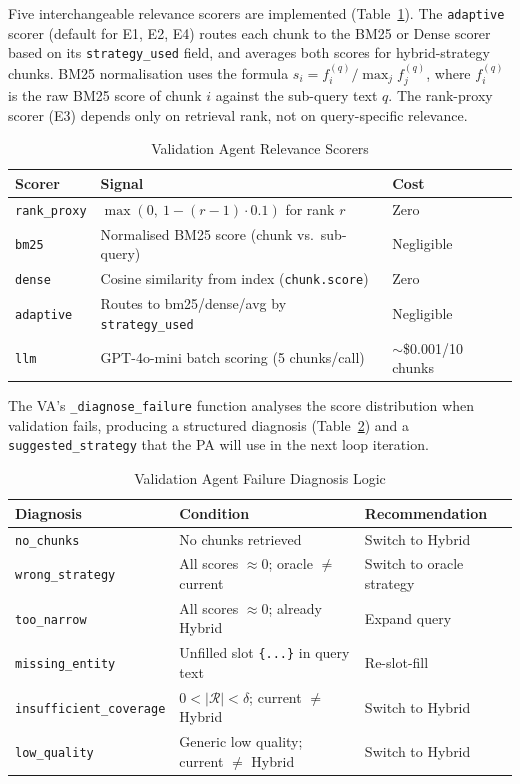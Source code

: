 \documentclass[11pt, a4paper]{article}
\begin{document}
Five interchangeable relevance scorers are implemented (Table~\ref{tab:scorers}). The \texttt{adaptive} scorer (default for E1, E2, E4) routes each chunk to the BM25 or Dense scorer based on its \texttt{strategy\_used} field, and averages both scores for hybrid-strategy chunks. BM25 normalisation uses the formula $s_i = f_i^{(q)} / \max_j f_j^{(q)}$, where $f_i^{(q)}$ is the raw BM25 score of chunk $i$ against the sub-query text $q$. The rank-proxy scorer (E3) depends only on retrieval rank, not on query-specific relevance.

\begin{table}[htbp]
\centering
\caption{Validation Agent Relevance Scorers}
\label{tab:scorers}
\begin{tabular}{lll}
\toprule
\textbf{Scorer} & \textbf{Signal} & \textbf{Cost} \\
\midrule
\texttt{rank\_proxy}  & $\max(0,\ 1 - (r{-}1) \cdot 0.1)$ for rank $r$ & Zero \\
\texttt{bm25}         & Normalised BM25 score (chunk vs.\ sub-query) & Negligible \\
\texttt{dense}        & Cosine similarity from index (\texttt{chunk.score}) & Zero \\
\texttt{adaptive}     & Routes to bm25/dense/avg by \texttt{strategy\_used} & Negligible \\
\texttt{llm}          & GPT-4o-mini batch scoring (5 chunks/call) & $\sim$\$0.001/10 chunks \\
\bottomrule
\end{tabular}
\end{table}

The VA's \texttt{\_diagnose\_failure} function analyses the score distribution when validation fails, producing a structured diagnosis (Table~\ref{tab:failure_diag}) and a \texttt{suggested\_strategy} that the PA will use in the next loop iteration.

\begin{table}[htbp]
\centering
\caption{Validation Agent Failure Diagnosis Logic}
\label{tab:failure_diag}
\begin{tabular}{lll}
\toprule
\textbf{Diagnosis} & \textbf{Condition} & \textbf{Recommendation} \\
\midrule
\texttt{no\_chunks}             & No chunks retrieved          & Switch to Hybrid \\
\texttt{wrong\_strategy}        & All scores $\approx 0$; oracle $\neq$ current & Switch to oracle strategy \\
\texttt{too\_narrow}            & All scores $\approx 0$; already Hybrid & Expand query \\
\texttt{missing\_entity}        & Unfilled slot \texttt{\{...\}} in query text & Re-slot-fill \\
\texttt{insufficient\_coverage} & $0 < |\mathcal{R}| < \delta$; current $\neq$ Hybrid & Switch to Hybrid \\
\texttt{low\_quality}           & Generic low quality; current $\neq$ Hybrid & Switch to Hybrid \\
\bottomrule
\end{tabular}
\end{table}
\end{document}
